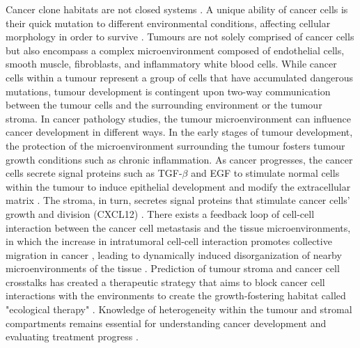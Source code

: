 Cancer clone habitats are not closed systems \cite{greaves2012clonal}. A unique ability of cancer cells is their quick mutation to different environmental conditions, affecting cellular morphology in order to survive \cite{clark2015modes}. Tumours are not solely comprised of cancer cells but also encompass a complex microenvironment composed of endothelial cells, smooth muscle, fibroblasts, and inflammatory white blood cells. While cancer cells within a tumour represent a group of cells that have accumulated dangerous mutations, tumour development is contingent upon two-way communication between the tumour cells and the surrounding environment or the tumour stroma. In cancer pathology studies, the tumour microenvironment can influence cancer development in different ways. In the early stages of tumour development, the protection of the microenvironment surrounding the tumour fosters tumour growth conditions such as chronic inflammation. As cancer progresses, the cancer cells secrete signal proteins such as TGF-$\beta$ and EGF to stimulate normal cells within the tumour to induce epithelial development and modify the extracellular matrix \cite{beck2011systematic,BREMNES2011209}. The stroma, in turn, secretes signal proteins that stimulate cancer cells' growth and division (\ie CXCL12) \cite{kumar2018analysis,wang2017role}. There exists a feedback loop of cell-cell interaction between the cancer cell metastasis and the tissue microenvironments, in which the increase in intratumoral cell-cell interaction promotes collective migration in cancer \cite{friedl2011cancer, whiteside2008tumor}, leading to dynamically induced disorganization of nearby microenvironments of the tissue \cite{friedl2012classifying, canel2013cadherin, almendro2013cellular, roussos2011chemotaxis, zervantonakis2012three}. Prediction of tumour stroma and cancer cell crosstalks has created a therapeutic strategy that aims to block cancer cell interactions with the environments to create the growth-fostering habitat called "ecological therapy" \cite{pienta2008ecological, calabrese2007perivascular, bissell2011don}. Knowledge of heterogeneity within the tumour and stromal compartments remains essential for understanding cancer development and evaluating treatment progress \cite{pages2010immune}.

